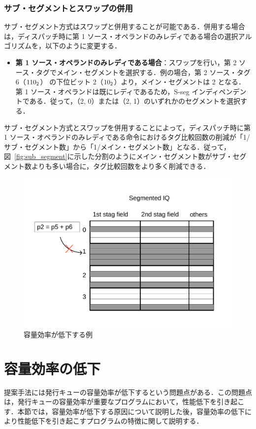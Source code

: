 \documentclass[submit,techrep,noauthor]{ipsj}
\newcommand{\fig}[1]{{図~\ref{fig:#1}}}
\begin{document}
\subsubsection{サブ・セグメントとスワップの併用}
サブ・セグメント方式はスワップと併用することが可能である．併用する場合は，ディスパッチ時に第 1 ソース・オペランドのみレディである場合の選択アルゴリズムを，以下のように変更する．
\begin{itemize}
  \item \textbf{第 1 ソース・オペランドのみレディである場合}：スワップを行い，第 2 ソース・タグでメイン・セグメントを選択する．例の場合，第 2 ソース・タグ 6（${\rm 110_2}$） の下位ビット 2（${\rm 10_2}$）より，メイン・セグメントは 2 となる．第 1 ソース・オペランドは既にレディであるため，S-seg インディペンデントである．従って，（2, 0）または（2, 1）のいずれかのセグメントを選択する．
\end{itemize}
サブ・セグメント方式とスワップを併用することによって，ディスパッチ時に第 1 ソース・オペランドのみレディである命令におけるタグ比較回数の削減が「1/サブ・セグメント数」から「1/メイン・セグメント数」となる．従って，\fig{sub_segment}に示した分割のようにメイン・セグメント数がサブ・セグメント数よりも多い場合に，タグ比較回数をより多く削減できる．

\begin{figure}[htb]
  \centering
  \includegraphics[keepaspectratio, scale=.8]{stall_segmentedIQ.pdf}
  \caption{容量効率が低下する例}
  \label{fig:stall_segmentedIQ}
\end{figure}

\section{容量効率の低下}
\label{sec:occupency_reduction}
提案手法には発行キューの容量効率が低下するという問題点がある．この問題点は，発行キューの容量効率が重要なプログラムにおいて，性能低下を引き起こす．本節では，容量効率が低下する原因について説明した後，容量効率の低下により性能低下を引き起こすプログラムの特徴に関して説明する．
\end{document}
